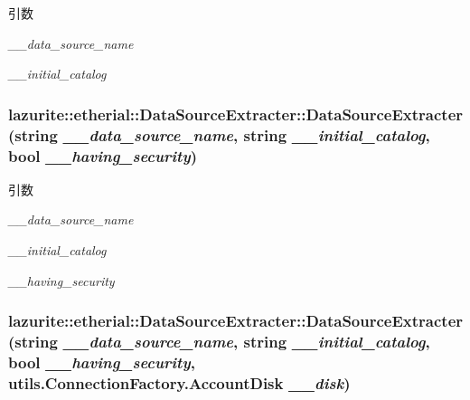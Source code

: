 \begin{DoxyParams}{引数}
\item[{\em \_\-\_\-data\_\-source\_\-name}]\item[{\em \_\-\_\-initial\_\-catalog}]\end{DoxyParams}
\hypertarget{classlazurite_1_1etherial_1_1_data_source_extracter_a558e771fb5f79119dfcb8244e87d95d4}{
\subsubsection[{DataSourceExtracter}]{\setlength{\rightskip}{0pt plus 5cm}lazurite::etherial::DataSourceExtracter::DataSourceExtracter (string {\em \_\-\_\-data\_\-source\_\-name}, \/  string {\em \_\-\_\-initial\_\-catalog}, \/  bool {\em \_\-\_\-having\_\-security})}}
\label{classlazurite_1_1etherial_1_1_data_source_extracter_a558e771fb5f79119dfcb8244e87d95d4}

\begin{DoxyParams}{引数}
\item[{\em \_\-\_\-data\_\-source\_\-name}]\item[{\em \_\-\_\-initial\_\-catalog}]\item[{\em \_\-\_\-having\_\-security}]\end{DoxyParams}
\hypertarget{classlazurite_1_1etherial_1_1_data_source_extracter_ace9948cf233a8af306d4c64345bdd832}{
\subsubsection[{DataSourceExtracter}]{\setlength{\rightskip}{0pt plus 5cm}lazurite::etherial::DataSourceExtracter::DataSourceExtracter (string {\em \_\-\_\-data\_\-source\_\-name}, \/  string {\em \_\-\_\-initial\_\-catalog}, \/  bool {\em \_\-\_\-having\_\-security}, \/  {\bf utils.ConnectionFactory.AccountDisk} {\em \_\-\_\-disk})}}
\label{classlazurite_1_1etherial_1_1_data_source_extracter_ace9948cf233a8af306d4c64345bdd832}


